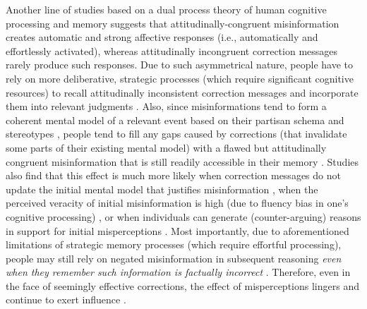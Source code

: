 \documentclass[man, 12pt, a4paper]{apa6}
\begin{document}
      Another line of studies based on a dual process theory of human cognitive processing and memory suggests that attitudinally-congruent misinformation creates automatic and strong affective responses (i.e., automatically and effortlessly activated), whereas attitudinally incongruent correction messages rarely produce such responses. Due to such asymmetrical nature, people have to rely on more deliberative, strategic processes (which require significant cognitive resources) to recall attitudinally inconsistent correction messages and incorporate them into relevant judgments \parencite{thorson_2016, Lewandowsky_2012PSPI, SwireEcker2018}. Also, since misinformations tend to form a coherent mental model of a relevant event based on their partisan schema and stereotypes \parencite[e.g.,][]{garrett2013undermining}, people tend to fill any gaps caused by corrections (that invalidate some parts of their existing mental model) with a flawed but attitudinally congruent misinformation that is still readily accessible in their memory \parencite{Lewandowsky_2012PSPI, SwireEcker2018}. Studies also find that this effect is much more likely when correction messages do not update the initial mental model that justifies misinformation \parencite{Chan_debunking_meta_2017, SwireEcker2018}, when the perceived veracity of initial misinformation is high (due to fluency bias in one's cognitive processing) \parencite{SwireEcker2018, Lewandowsky_2012PSPI}, or when individuals can generate (counter-arguing) reasons in support for initial misperceptions \parencite{garrett2013undermining, Chan_debunking_meta_2017}. Most importantly, due to aforementioned limitations of strategic memory processes (which require effortful processing), people may still rely on negated misinformation in subsequent reasoning \emph{even when they remember such information is factually incorrect} \parencite{Lewandowsky_2012PSPI}. Therefore, even in the face of seemingly effective corrections, the effect of misperceptions lingers and continue to exert influence \parencite[e.g.,][]{thorson_2016}.  
      
\end{document}

